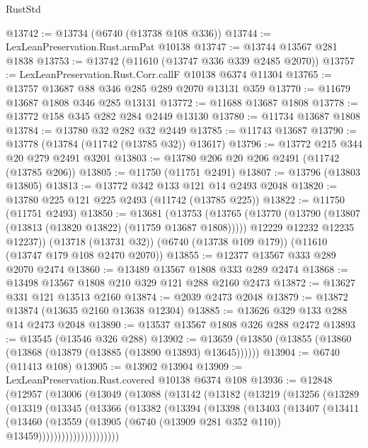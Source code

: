 \begin{lexlean}{RustStd}
\begin{coremodule}
@13742 := @13734 (@6740 (@13738 @108 @336))
@13744 := LexLeanPreservation.Rust.armPat @10138
@13747 := @13744 @13567 @281 @1838
@13753 := @13742 (@11610 (@13747 @336 @339 @2485 @2070))
@13757 := LexLeanPreservation.Rust.Corr.callF @10138 @6374 @11304
@13765 := @13757 @13687 @88 @346 @285 @289 @2070 @13131 @359
@13770 := @11679 @13687 @1808 @346 @285 @13131
@13772 := @11688 @13687 @1808
@13778 := @13772 @158 @345 @282 @284 @2449 @13130
@13780 := @11734 @13687 @1808
@13784 := @13780 @32 @282 @32 @2449
@13785 := @11743 @13687
@13790 := @13778 (@13784 (@11742 (@13785 @32)) @13617)
@13796 := @13772 @215 @344 @20 @279 @2491 @3201
@13803 := @13780 @206 @20 @206 @2491 (@11742 (@13785 @206))
@13805 := @11750 (@11751 @2491)
@13807 := @13796 (@13803 @13805)
@13813 := @13772 @342 @133 @121 @14 @2493 @2048
@13820 := @13780 @225 @121 @225 @2493 (@11742 (@13785 @225))
@13822 := @11750 (@11751 @2493)
@13850 := @13681
    (@13753
      (@13765
        (@13770 (@13790 (@13807 (@13813 (@13820 @13822) (@11759 @13687 @1808)))))
        @12229
        @12232
        @12235
        @12237))
    (@13718 (@13731 @32))
    (@6740 (@13738 @109 @179))
    (@11610 (@13747 @179 @108 @2470 @2070))
@13855 := @12377 @13567 @333 @289 @2070 @2474
@13860 := @13489 @13567 @1808 @333 @289 @2474
@13868 := @13498 @13567 @1808 @210 @329 @121 @288 @2160 @2473
@13872 := @13627 @331 @121 @13513 @2160
@13874 := @2039 @2473 @2048
@13879 := @13872 @13874 (@13635 @2160 @13638 @12304)
@13885 := @13626 @329 @133 @288 @14 @2473 @2048
@13890 := @13537 @13567 @1808 @326 @288 @2472
@13893 := @13545 (@13546 @326 @288)
@13902 := @13659 (@13850 (@13855 (@13860 (@13868 (@13879 (@13885 (@13890 @13893) @13645))))))
@13904 := @6740 (@11413 @108)
@13905 := @13902 @13904
@13909 := LexLeanPreservation.Rust.covered @10138 @6374 @108
@13936 := @12848
    (@12957
      (@13006
        (@13049
          (@13088
            (@13142
              (@13182
                (@13219
                  (@13256
                    (@13289
                      (@13319
                        (@13345
                          (@13366
                            (@13382
                              (@13394
                                (@13398
                                  (@13403
                                    (@13407
                                      (@13411
                                        (@13460
                                          (@13559
                                            (@13905
                                              (@6740 (@13909 @281 @352 @110))
                                              @13459)))))))))))))))))))))

\end{coremodule}
\end{lexlean}
